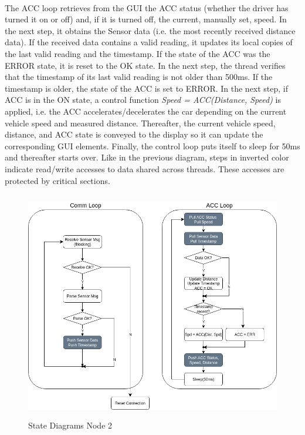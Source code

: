 \paragraph{}
The ACC loop retrieves from the GUI the ACC status (whether the driver has turned it on or off) and, if it is turned off, the current, manually set, speed. In the next step, it obtains the Sensor data (i.e. the most recently received distance data). If the received data contains a valid reading, it updates its local copies of the last valid reading and the timestamp. If the state of the ACC was the ERROR state, it is reset to the OK state. In the next step, the thread verifies that the timestamp of its last valid reading is not older than 500ms. If the timestamp is older, the state of the ACC is set to ERROR.
In the next step, if ACC is in the ON state, a control function \emph{Speed = ACC(Distance, Speed)} is applied, i.e. the ACC accelerates/decelerates the car depending on the current vehicle speed and measured distance.
Thereafter, the current vehicle speed, distance, and ACC state is conveyed to the display so it can update the corresponding GUI elements. Finally, the control loop puts itself to sleep for 50ms and thereafter starts over. Like in the previous diagram, steps in inverted color indicate read/write accesses to data shared across threads. These accesses are protected by critical sections.

\begin{figure}[h]
	\includegraphics[height=100mm]{images/StateDiagramNode2.png}
	\centering
	\caption{State Diagrams Node 2}
	\label{fig:stateDiagramNode2}
\end{figure}
